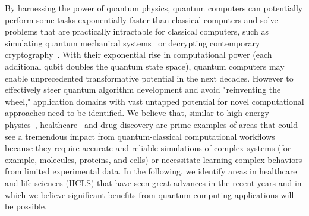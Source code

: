 \documentclass{article}
\begin{document}
By harnessing the power of quantum physics, quantum computers can potentially perform some tasks exponentially faster than classical computers and solve problems that are practically intractable for classical computers, such as simulating quantum mechanical systems~\cite{boghosian1998simulating} or decrypting contemporary cryptography~\cite{shor1994algorithms}.
With their exponential rise in computational power (each additional qubit doubles the quantum state space), quantum computers may enable unprecedented transformative potential in the next decades.
However to effectively steer quantum algorithm development and avoid "reinventing the wheel," application domains with vast untapped potential for novel computational approaches need to be identified. 
We believe that, similar to high-energy physics~\cite{dimeglio2023quantum}, healthcare~\cite{floether_2023} and drug discovery \cite{cao2018potential} are prime examples of areas that could see a tremendous impact from quantum-classical computational workflows because they require accurate and reliable simulations of complex systems (for example, molecules, proteins, and cells) or necessitate learning complex behaviors from limited experimental data. In the following, we identify areas in healthcare and life sciences (HCLS) that have seen great advances in the recent years and in which  we believe significant benefits from quantum computing applications will be possible.  
\end{document}
